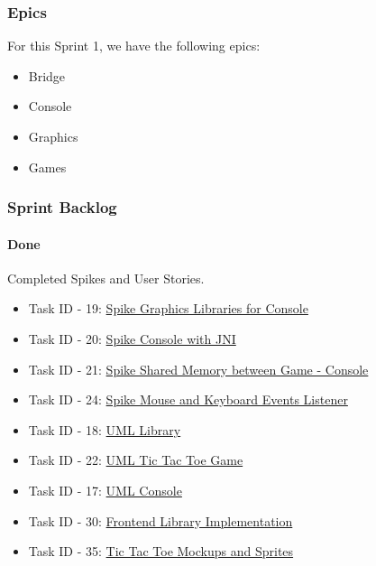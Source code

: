 \newpage

\subsubsection{Epics}

For this Sprint 1, we have the following epics:

\begin{itemize}
    \item Bridge
    \item Console
    \item Graphics
    \item Games
\end{itemize}

\subsubsection{Sprint Backlog}

\paragraph{Done}

Completed Spikes and User Stories.
\begin{itemize}
    \item Task ID - 19: \href{https://tree.taiga.io/project/joseluis-teran-coffeetime/us/19?milestone=392128}{Spike Graphics Libraries for Console}
    \item Task ID - 20: \href{https://tree.taiga.io/project/joseluis-teran-coffeetime/us/20?milestone=392128}{Spike Console with JNI}
    \item Task ID - 21: \href{https://tree.taiga.io/project/joseluis-teran-coffeetime/us/21?milestone=392128}{Spike Shared Memory between Game - Console}
    \item Task ID - 24: \href{https://tree.taiga.io/project/joseluis-teran-coffeetime/us/24?milestone=392128}{Spike Mouse and Keyboard Events Listener}
    \item Task ID - 18: \href{https://tree.taiga.io/project/joseluis-teran-coffeetime/us/18?milestone=392128}{UML Library}
    \item Task ID - 22: \href{https://tree.taiga.io/project/joseluis-teran-coffeetime/us/22?milestone=392128}{UML Tic Tac Toe Game}
    \item Task ID - 17: \href{https://tree.taiga.io/project/joseluis-teran-coffeetime/us/17?milestone=392128}{UML Console}
    \item Task ID - 30: \href{https://tree.taiga.io/project/joseluis-teran-coffeetime/us/30?milestone=392128}{Frontend Library Implementation}
    \item Task ID - 35: \href{https://tree.taiga.io/project/joseluis-teran-coffeetime/us/35?milestone=392128}{Tic Tac Toe Mockups and Sprites}    
\end{itemize}

